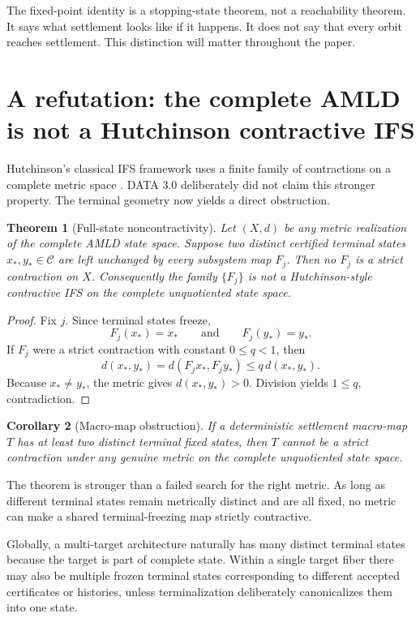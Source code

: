 \documentclass[11pt]{article}
\newtheorem{theorem}{Theorem}[section]
\newtheorem{corollary}[theorem]{Corollary}
\theoremstyle{definition}
\theoremstyle{remark}
\newcommand{\Cset}{\mathcal C}
\begin{document}
The fixed-point identity is a stopping-state theorem, not a reachability theorem. It says what settlement looks like if it happens. It does not say that every orbit reaches settlement. This distinction will matter throughout the paper.

\section{A refutation: the complete AMLD is not a Hutchinson contractive IFS}

Hutchinson's classical IFS framework uses a finite family of contractions on a complete metric space \cite{Hutchinson}. DATA 3.0 deliberately did not claim this stronger property. The terminal geometry now yields a direct obstruction.

\begin{theorem}[Full-state noncontractivity]\label{thm:noncontract}
Let $(X,d)$ be any metric realization of the complete AMLD state space. Suppose two distinct certified terminal states $x_*,y_*\in\Cset$ are left unchanged by every subsystem map $F_j$. Then no $F_j$ is a strict contraction on $X$. Consequently the family $\{F_j\}$ is not a Hutchinson-style contractive IFS on the complete unquotiented state space.
\end{theorem}

\begin{proof}
Fix $j$. Since terminal states freeze,
\[
F_j(x_*)=x_*\qquad\text{and}\qquad F_j(y_*)=y_*.
\]
If $F_j$ were a strict contraction with constant $0\le q<1$, then
\[
d(x_*,y_*)
=d(F_jx_*,F_jy_*)
\le q\,d(x_*,y_*).
\]
Because $x_*\neq y_*$, the metric gives $d(x_*,y_*)>0$. Division yields $1\le q$, contradiction.
\end{proof}

\begin{corollary}[Macro-map obstruction]
If a deterministic settlement macro-map $T$ has at least two distinct terminal fixed states, then $T$ cannot be a strict contraction under any genuine metric on the complete unquotiented state space.
\end{corollary}

The theorem is stronger than a failed search for the right metric. As long as different terminal states remain metrically distinct and are all fixed, no metric can make a shared terminal-freezing map strictly contractive.

Globally, a multi-target architecture naturally has many distinct terminal states because the target is part of complete state. Within a single target fiber there may also be multiple frozen terminal states corresponding to different accepted certificates or histories, unless terminalization deliberately canonicalizes them into one state.
\end{document}
